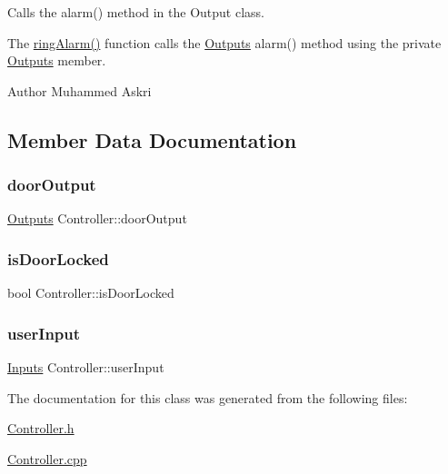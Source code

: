 Calls the alarm() method in the Output class. 

The \hyperlink{classController_a051818aaff4b6e373881e1878faeaca7}{ring\+Alarm()} function calls the \hyperlink{classOutputs}{Outputs} alarm() method using the private \hyperlink{classOutputs}{Outputs} member.

\begin{DoxyAuthor}{Author}
Muhammed Askri 
\end{DoxyAuthor}


\subsection{Member Data Documentation}
\mbox{\label{classController_a3eb48522d8dd1a23add8245718b32afc}} 
\subsubsection{\texorpdfstring{door\+Output}{doorOutput}}
{\footnotesize\ttfamily \hyperlink{classOutputs}{Outputs} Controller\+::door\+Output\hspace{0.3cm}{\ttfamily [private]}}

\mbox{\label{classController_a9101b152cf0c199bc384d977d61292c6}} 
\subsubsection{\texorpdfstring{is\+Door\+Locked}{isDoorLocked}}
{\footnotesize\ttfamily bool Controller\+::is\+Door\+Locked\hspace{0.3cm}{\ttfamily [private]}}

\mbox{\label{classController_a92f87bee57ce9161bb5df6b5e69fedb7}} 
\subsubsection{\texorpdfstring{user\+Input}{userInput}}
{\footnotesize\ttfamily \hyperlink{classInputs}{Inputs} Controller\+::user\+Input\hspace{0.3cm}{\ttfamily [private]}}



The documentation for this class was generated from the following files\+:\begin{DoxyCompactItemize}
\item 
\hyperlink{Controller_8h}{Controller.\+h}\item 
\hyperlink{Controller_8cpp}{Controller.\+cpp}\end{DoxyCompactItemize}
